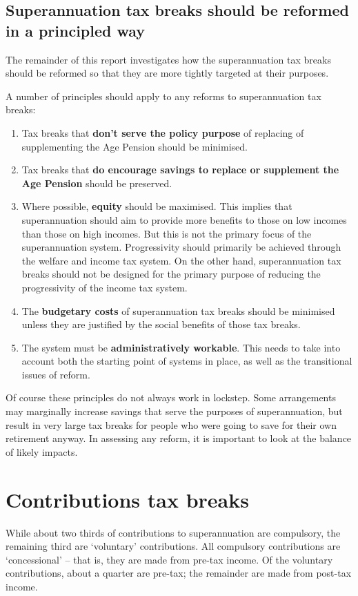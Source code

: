 \onecolumn
\begin{multicols}{2}
\section{Superannuation tax breaks should be reformed in a principled way\label{sec:SUPER-3-9}}
The remainder of this report investigates how the superannuation tax breaks should be reformed so that they are more tightly targeted at their purposes. 

A number of principles should apply to any reforms to superannuation tax breaks:
\begin{enumerate}
\item Tax breaks that \textbf{don't serve the policy purpose} of replacing of supplementing the Age Pension should be minimised.
\item	Tax breaks that \textbf{do encourage savings to replace or supplement the Age Pension} should be preserved. 
\item	Where possible, \textbf{equity} should be maximised. This implies that superannuation should aim to provide more benefits to those on low incomes than those on high incomes. But this is not the primary focus of the superannuation system. Progressivity should primarily be achieved through the welfare and income tax system. On the other hand, superannuation tax breaks should not be designed for the primary purpose of reducing the progressivity of the income tax system. 
\item	The \textbf{budgetary costs} of superannuation tax breaks should be minimised unless they are justified by the social benefits of those tax breaks.
\item	The system must be \textbf{administratively workable}. This needs to take into account both the starting point of systems in place, as well as the transitional issues of reform.
\end{enumerate}

Of course these principles do not always work in lockstep. Some arrangements may marginally increase savings that serve the purposes of superannuation, but result in very large tax breaks for people who were going to save for their own retirement anyway. In assessing any reform, it is important to look at the balance of likely impacts.
\end{multicols}
\twocolumn


\chapter{Contributions tax breaks}
While about two thirds of contributions to superannuation are compulsory, the remaining third are ‘voluntary’ contributions. All compulsory contributions are ‘concessional’ – that is, they are made from pre-tax income. Of the voluntary contributions, about a quarter are pre-tax; the remainder are made from post-tax income.

